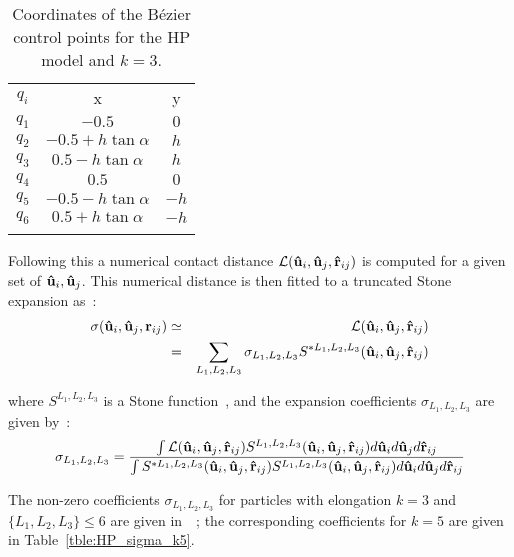 \begin{table}
	\centering	
	\begin{tabular}{||c||c||c||}
	\hhline{|t:=:t:=:t:=:t|}
	\hspace*{2mm} $q_i$ \hspace{2mm} &\hspace{2mm} x \hspace{2mm}	&\hspace{2mm} y \hspace{2mm}\\
	\hhline{|:=::=::=:|}
	$q_1$	&$-0.5$			&$0$		\\
	$q_2$	&$-0.5+ h\tan\alpha$	&$h$		\\
	$q_3$	&$0.5 - h\tan\alpha$	&$h$		\\
	$q_4$	&$0.5$			&$0$		\\
	$q_5$	&$-0.5 - h\tan\alpha$	&$-h$		\\
	$q_6$	&$0.5 + h\tan\alpha$	&$-h$		\\
	\hhline{|b:=:b:=:b:=:b|}
	\end{tabular}
	\caption{Coordinates of the B\'ezier control points for the HP model and $k=3$.}
	\label{tble:HP_ctrlPts_k3}
\end{table}


Following this a numerical
contact distance $\mathcal{L}(\mathbf{\hat{u} }_i,\mathbf{\hat{u} }_j,\mathbf{\hat{r} }_{ij} )$ is computed for a given
set of $\mathbf{\hat{u} }_i, \mathbf{\hat{u} }_j$. This numerical distance is then fitted to a truncated Stone expansion as~:
\begin{eqnarray}
	\sigma(\mathbf{\hat{u} }_i,\mathbf{\hat{u} }_j,\mathbf{r}_{ij})   &\simeq&  \mathcal{L}(\mathbf{\hat{u} }_i,\mathbf{\hat{u} }_j,\mathbf{\hat{r} }_{ij}) \nonumber \\
	        &=& \sum_{L_1,L_2,L_3}\sigma_{L_1, L_2, L_3}S^{*L_1, L_2, L_3}(\mathbf{\hat{u} }_i,\mathbf{\hat{u} }_j,\mathbf{\hat{r} }_{ij})
	\label{eqn:Stone_sigma1}
\end{eqnarray}

where $S^{L_1, L_2, L_3}$ is a Stone function~\cite{Stone}, and the expansion coefficients 
$\sigma_{L_1, L_2,L_3}$ are given by~:
\begin{equation}
	\sigma_{L_1, L_2, L_3} = \frac
	{
	\int \mathcal{L}(\mathbf{\hat{u} }_i,\mathbf{\hat{u} }_j,\mathbf{\hat{r} }_{ij})S^{L_1, L_2, L_3}
	(\mathbf{\hat{u} }_i,\mathbf{\hat{u} }_j,\mathbf{\hat{r} }_{ij})d\mathbf{\hat{u} }_i d\mathbf{\hat{u} }_j d\mathbf{\hat{r} }_{ij}
	}
	{
	\int S^{*L_1, L_2, L_3}(\mathbf{\hat{u} }_i,\mathbf{\hat{u} }_j,\mathbf{\hat{r} }_{ij})S^{L_1, L_2, L_3}
	(\mathbf{\hat{u} }_i,\mathbf{\hat{u} }_j,\mathbf{\hat{r} }_{ij})d\mathbf{\hat{u} }_i d\mathbf{\hat{u} }_j d\mathbf{\hat{r} }_{ij}
	}
	\label{eqn:Stone_sigma2}
\end{equation}

The non-zero coefficients $\sigma_{L_1, L_2, L_3}$ for particles with elongation $k=3$ and \\
$\{L_1, L_2, L_3\} \leq 6$ are given
in~\cite{BerardiRicci01}~; the corresponding coefficients for $k=5$ are
given in Table~\ref{tble:HP_sigma_k5}.\\

